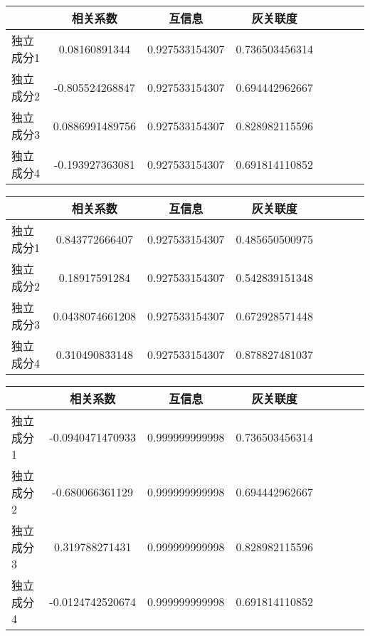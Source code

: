 \begin{table}[!htbp] 
\begin{center}
\begin{tabular}{lccclccc} 
 \toprule 
& 相关系数   & 互信息    &灰关联度 \\ 
\midrule 
独立成分1	& 0.08160891344	& 0.927533154307	& 0.736503456314	\\ 
独立成分2	& -0.805524268847	& 0.927533154307	& 0.694442962667	\\ 
独立成分3	& 0.0886991489756	& 0.927533154307	& 0.828982115596	\\ 
独立成分4	& -0.193927363081	& 0.927533154307	& 0.691814110852	\\ 
\bottomrule 
 \end{tabular} 
\end{center} 
 \end{table} 


\begin{table}[!htbp] 
\begin{center}
\begin{tabular}{lccclccc} 
 \toprule 
& 相关系数   & 互信息    &灰关联度 \\ 
\midrule 
独立成分1	& 0.843772666407	& 0.927533154307	& 0.485650500975	\\ 
独立成分2	& 0.18917591284	& 0.927533154307	& 0.542839151348	\\ 
独立成分3	& 0.0438074661208	& 0.927533154307	& 0.672928571448	\\ 
独立成分4	& 0.310490833148	& 0.927533154307	& 0.878827481037	\\ 
\bottomrule 
 \end{tabular} 
\end{center} 
 \end{table} 


\begin{table}[!htbp] 
\begin{center}
\begin{tabular}{lccclccc} 
 \toprule 
& 相关系数   & 互信息    &灰关联度 \\ 
\midrule 
独立成分1	& -0.0940471470933	& 0.999999999998	& 0.736503456314	\\ 
独立成分2	& -0.680066361129	& 0.999999999998	& 0.694442962667	\\ 
独立成分3	& 0.319788271431	& 0.999999999998	& 0.828982115596	\\ 
独立成分4	& -0.0124742520674	& 0.999999999998	& 0.691814110852	\\ 
\bottomrule 
 \end{tabular} 
\end{center} 
 \end{table} 


